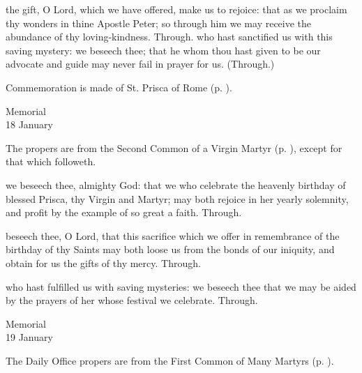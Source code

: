
\postcommunion
{} the gift, O Lord, which we have offered, make us to rejoice: that as we proclaim thy wonders in thine Apostle Peter; so through him we may receive the abundance of thy loving-kindness. Through.
 who hast sanctified us with this saving mystery: we beseech thee; that he whom thou hast given to be our advocate and guide may never fail in prayer for us. (Through.)

\begin{rubric}
    Commemoration is made of St. Prisca of Rome (p. \pageref{PriscaPostcommunion}).
\end{rubric}


\begin{inhead}
    {Memorial\\
18 January}
\end{inhead}

\begin{rubric}
	The propers are from the Second Common of a Virgin Martyr (p. \pageref{CommonVirginMartyrII}), except for that which followeth.
\end{rubric}

\collect\label{PriscaCollect}
 we beseech thee, almighty God: that we who celebrate the heavenly birthday of blessed Prisca, thy Virgin and Martyr; may both rejoice in her yearly solemnity, and profit by the example of so great a faith. Through.

\secret\label{PriscaSecret}
 beseech thee, O Lord, that this sacrifice which we offer in remembrance of the birthday of thy Saints may both loose us from the bonds of our iniquity, and obtain for us the gifts of thy mercy. Through.

\postcommunion\label{PriscaPostcommunion}
 who hast fulfilled us with saving mysteries: we beseech thee that we may be aided by the prayers of her whose festival we celebrate. Through.


\begin{inhead}
    {Memorial\\
19 January}
\end{inhead}

\begin{rubric}
	The Daily Office propers are from the First Common of Many Martyrs (p. \pageref{CommonMartyrsI}).
\end{rubric}

